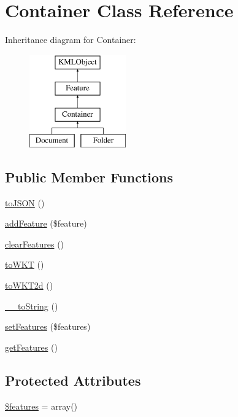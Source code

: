 \hypertarget{classContainer}{
\section{Container Class Reference}
\label{d0/d7b/classContainer}
}
Inheritance diagram for Container:\begin{figure}[H]
\begin{center}
\leavevmode
\includegraphics[height=4.000000cm]{d0/d7b/classContainer}
\end{center}
\end{figure}
\subsection*{Public Member Functions}
\begin{DoxyCompactItemize}
\item 
\hyperlink{classContainer_a61a8ba49aba4f10d8e4cd7a5336876b0}{toJSON} ()
\item 
\hyperlink{classContainer_ac5a2f6ec26f2c3a915613e3d7ebcac20}{addFeature} (\$feature)
\item 
\hyperlink{classContainer_a9fe1dfd39e63c0d5bce14d192b91b4a6}{clearFeatures} ()
\item 
\hyperlink{classContainer_a6a80e0c5c46f903c6268ef9b0df7a93b}{toWKT} ()
\item 
\hyperlink{classContainer_a4c9e14a8c56574b8953488faca680085}{toWKT2d} ()
\item 
\hyperlink{classContainer_a127543c2c61f2c4a98faa9597079150b}{\_\-\_\-toString} ()
\item 
\hyperlink{classContainer_a3af4e4fe25d13cefc9a5b0d1f5b02459}{setFeatures} (\$features)
\item 
\hyperlink{classContainer_a9bd81e65717d1ae978b3ed732dc0bc0d}{getFeatures} ()
\end{DoxyCompactItemize}
\subsection*{Protected Attributes}
\begin{DoxyCompactItemize}
\item 
\hyperlink{classContainer_a3ca0e9148ad4c732b2a0957e285aadff}{\$features} = array()
\end{DoxyCompactItemize}


